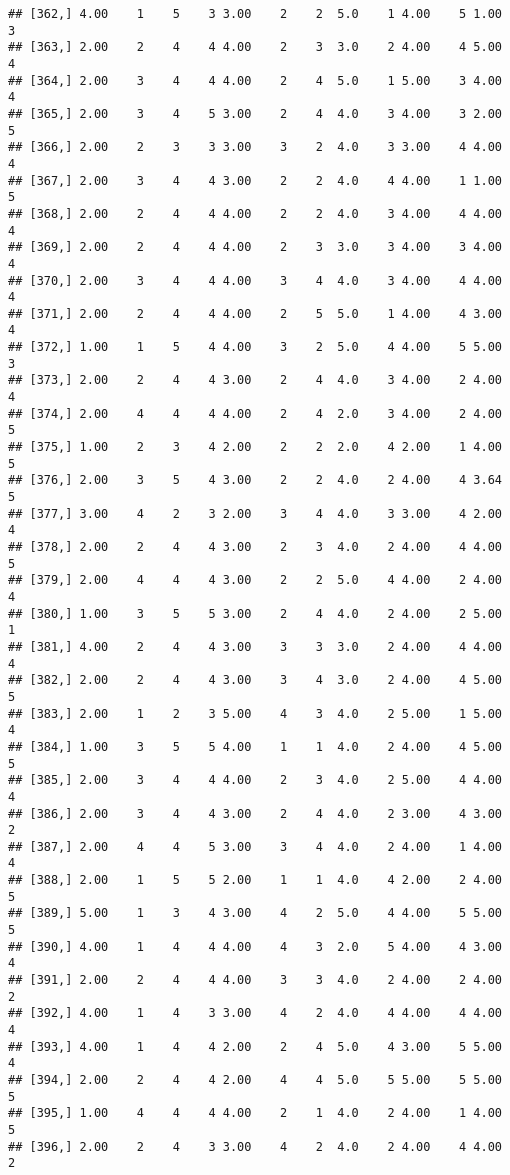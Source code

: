 \documentclass[]{article}
\begin{document}
\begin{verbatim}
## [362,] 4.00    1    5    3 3.00    2    2  5.0    1 4.00    5 1.00    3
## [363,] 2.00    2    4    4 4.00    2    3  3.0    2 4.00    4 5.00    4
## [364,] 2.00    3    4    4 4.00    2    4  5.0    1 5.00    3 4.00    4
## [365,] 2.00    3    4    5 3.00    2    4  4.0    3 4.00    3 2.00    5
## [366,] 2.00    2    3    3 3.00    3    2  4.0    3 3.00    4 4.00    4
## [367,] 2.00    3    4    4 3.00    2    2  4.0    4 4.00    1 1.00    5
## [368,] 2.00    2    4    4 4.00    2    2  4.0    3 4.00    4 4.00    4
## [369,] 2.00    2    4    4 4.00    2    3  3.0    3 4.00    3 4.00    4
## [370,] 2.00    3    4    4 4.00    3    4  4.0    3 4.00    4 4.00    4
## [371,] 2.00    2    4    4 4.00    2    5  5.0    1 4.00    4 3.00    4
## [372,] 1.00    1    5    4 4.00    3    2  5.0    4 4.00    5 5.00    3
## [373,] 2.00    2    4    4 3.00    2    4  4.0    3 4.00    2 4.00    4
## [374,] 2.00    4    4    4 4.00    2    4  2.0    3 4.00    2 4.00    5
## [375,] 1.00    2    3    4 2.00    2    2  2.0    4 2.00    1 4.00    5
## [376,] 2.00    3    5    4 3.00    2    2  4.0    2 4.00    4 3.64    5
## [377,] 3.00    4    2    3 2.00    3    4  4.0    3 3.00    4 2.00    4
## [378,] 2.00    2    4    4 3.00    2    3  4.0    2 4.00    4 4.00    5
## [379,] 2.00    4    4    4 3.00    2    2  5.0    4 4.00    2 4.00    4
## [380,] 1.00    3    5    5 3.00    2    4  4.0    2 4.00    2 5.00    1
## [381,] 4.00    2    4    4 3.00    3    3  3.0    2 4.00    4 4.00    4
## [382,] 2.00    2    4    4 3.00    3    4  3.0    2 4.00    4 5.00    5
## [383,] 2.00    1    2    3 5.00    4    3  4.0    2 5.00    1 5.00    4
## [384,] 1.00    3    5    5 4.00    1    1  4.0    2 4.00    4 5.00    5
## [385,] 2.00    3    4    4 4.00    2    3  4.0    2 5.00    4 4.00    4
## [386,] 2.00    3    4    4 3.00    2    4  4.0    2 3.00    4 3.00    2
## [387,] 2.00    4    4    5 3.00    3    4  4.0    2 4.00    1 4.00    4
## [388,] 2.00    1    5    5 2.00    1    1  4.0    4 2.00    2 4.00    5
## [389,] 5.00    1    3    4 3.00    4    2  5.0    4 4.00    5 5.00    5
## [390,] 4.00    1    4    4 4.00    4    3  2.0    5 4.00    4 3.00    4
## [391,] 2.00    2    4    4 4.00    3    3  4.0    2 4.00    2 4.00    2
## [392,] 4.00    1    4    3 3.00    4    2  4.0    4 4.00    4 4.00    4
## [393,] 4.00    1    4    4 2.00    2    4  5.0    4 3.00    5 5.00    4
## [394,] 2.00    2    4    4 2.00    4    4  5.0    5 5.00    5 5.00    5
## [395,] 1.00    4    4    4 4.00    2    1  4.0    2 4.00    1 4.00    5
## [396,] 2.00    2    4    3 3.00    4    2  4.0    2 4.00    4 4.00    2

\end{verbatim}
\end{document}
